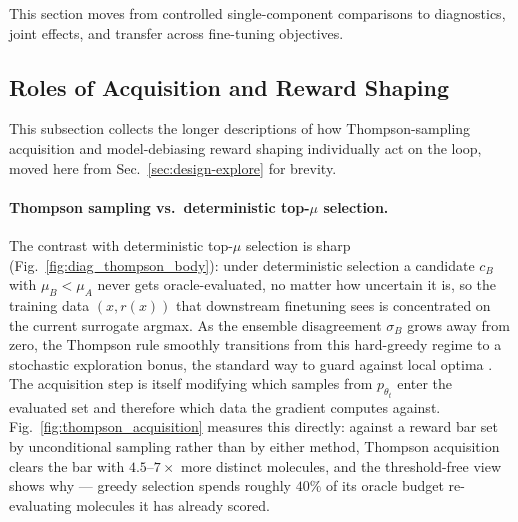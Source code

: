 \documentclass{article}
\begin{document}
This section moves from controlled single-component comparisons to diagnostics, joint effects, and transfer across fine-tuning objectives.

\subsection{Roles of Acquisition and Reward Shaping}\label{app:knob-interactions}

This subsection collects the longer descriptions of how Thompson-sampling acquisition and model-debiasing reward shaping individually act on the loop, moved here from Sec.~\ref{sec:design-explore} for brevity.

\paragraph{Thompson sampling vs.\ deterministic top-$\mu$ selection.} The contrast with deterministic top-$\mu$ selection is sharp (Fig.~\ref{fig:diag_thompson_body}): under deterministic selection a candidate $c_B$ with $\mu_B < \mu_A$ never gets oracle-evaluated, no matter how uncertain it is, so the training data $(x, r(x))$ that downstream finetuning sees is concentrated on the current surrogate argmax. As the ensemble disagreement $\sigma_B$ grows away from zero, the Thompson rule smoothly transitions from this hard-greedy regime to a stochastic exploration bonus, the standard way to guard against local optima \citep{chapelle2011empirical}. The acquisition step is itself modifying which samples from $p_{\theta_t}$ enter the evaluated set and therefore which data the gradient computes against. Fig.~\ref{fig:thompson_acquisition} measures this directly: against a reward bar set by unconditional sampling rather than by either method, Thompson acquisition clears the bar with $4.5$--$7\times$ more distinct molecules, and the threshold-free view shows why --- greedy selection spends roughly $40\%$ of its oracle budget re-evaluating molecules it has already scored.
\end{document}

